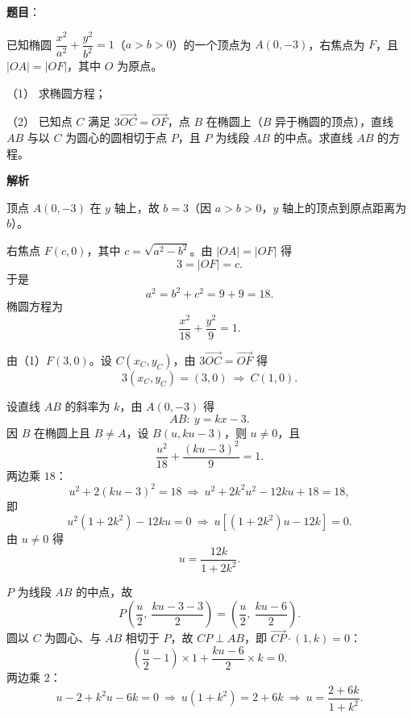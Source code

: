 \begin{answer}

\textbf{题目}：

已知椭圆 $\dfrac{x^2}{a^2}+\dfrac{y^2}{b^2}=1$（$a>b>0$）的一个顶点为 $A(0,-3)$，右焦点为 $F$，且 $|OA|=|OF|$，其中 $O$ 为原点。

（1） 求椭圆方程；

（2） 已知点 $C$ 满足 $3\overrightarrow{OC}=\overrightarrow{OF}$，点 $B$ 在椭圆上（$B$ 异于椭圆的顶点），直线 $AB$ 与以 $C$ 为圆心的圆相切于点 $P$，且 $P$ 为线段 $AB$ 的中点。求直线 $AB$ 的方程。

\textbf{解析}


顶点 $A(0,-3)$ 在 $y$ 轴上，故 $b=3$（因 $a>b>0$，$y$ 轴上的顶点到原点距离为 $b$）。

右焦点 $F(c,0)$，其中 $c=\sqrt{a^2-b^2}$。由 $|OA|=|OF|$ 得
\nopagebreak[4]
\[3=|OF|=c .\]
于是
\nopagebreak[4]
\[a^2=b^2+c^2=9+9=18 .\]
椭圆方程为
\nopagebreak[4]
\[\frac{x^2}{18}+\frac{y^2}9=1 .\]


由（1）$F(3,0)$。设 $C(x_C,y_C)$，由 $3\overrightarrow{OC}=\overrightarrow{OF}$ 得
\nopagebreak[4]
\[3(x_C,y_C)=(3,0)\ \Longrightarrow\ C(1,0).\]

设直线 $AB$ 的斜率为 $k$，由 $A(0,-3)$ 得
\nopagebreak[4]
\[AB:\ y=kx-3 .\]
因 $B$ 在椭圆上且 $B\neq A$，设 $B(u,ku-3)$，则 $u\neq0$，且
\nopagebreak[4]
\[\frac{u^2}{18}+\frac{(ku-3)^2}9=1 .\]
两边乘 $18$：
\nopagebreak[4]
\[u^2+2(ku-3)^2=18\ \Longrightarrow\ u^2+2k^2u^2-12ku+18=18,\]
即
\nopagebreak[4]
\[u^2(1+2k^2)-12ku=0\ \Longrightarrow\ u\left[(1+2k^2)u-12k\right]=0 .\]
由 $u\neq0$ 得
\nopagebreak[4]
\[u=\frac{12k}{1+2k^2}. \tag{1}\]

$P$ 为线段 $AB$ 的中点，故
\nopagebreak[4]
\[P\left(\frac u2,\ \frac{ku-3-3}2\right)=\left(\frac u2,\ \frac{ku-6}2\right).\]
圆以 $C$ 为圆心、与 $AB$ 相切于 $P$，故 $CP\perp AB$，即 $\overrightarrow{CP}\cdot(1,k)=0$：
\nopagebreak[4]
\[\left(\frac u2-1\right)\times1+\frac{ku-6}2\times k=0 .\]
两边乘 $2$：
\nopagebreak[4]
\[u-2+k^2u-6k=0\ \Longrightarrow\ u(1+k^2)=2+6k\ \Longrightarrow\ u=\frac{2+6k}{1+k^2}. \tag{2}\]


\end{answer}
